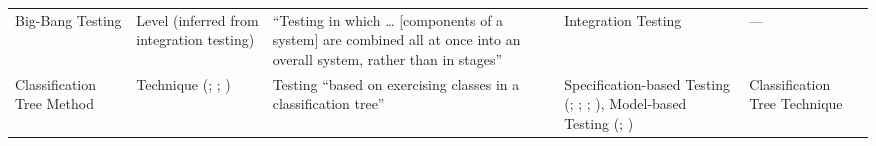 \begin{table}[hbtp!]
\begin{tabularx}{\linewidth}{|m{1.7cm}|m{4.2cm}|X|m{7.7cm}|m{2.8cm}|}
        Big-Bang Testing           & Level (inferred from integration testing)                                                      & ``Testing in which \dots{} [components of a system] are combined all at once into an overall system, rather than in stages'' \citep[p.~45]{IEEE2017} & Integration Testing \citetext{\citealp[p.~45]{IEEE2017}; \citealp[p.~5-7]{SWEBOK2024}; \citealp[p.~603]{SharmaEtAl2021}; \citealp[p.~42]{Kam2008}}                                                                                & ---                                           \\[1cm]
        Classification Tree Method & Technique (\citealp[p.~22]{IEEE2022}; \citeyear[pp.~2,~12,~Fig.~2]{IEEE2021}; \citealpISTQB{}) & Testing ``based on exercising classes in a classification tree'' \citep[p.~22]{IEEE2021}                                                             & Specification-based Testing (\citealp[p.~22]{IEEE2022}; \citeyear[pp.~2,~12,~Fig.~2]{IEEE2021}; \citealpISTQB{}; \citealp[p.~47]{Firesmith2015}), Model-based Testing (\citealp[p.~13]{IEEE2022}; \citeyear[pp.~6,~12]{IEEE2021}) & Classification Tree Technique \citepISTQB{}   \\[1.5cm] %
        \hline
    \end{tabularx}
\end{table}